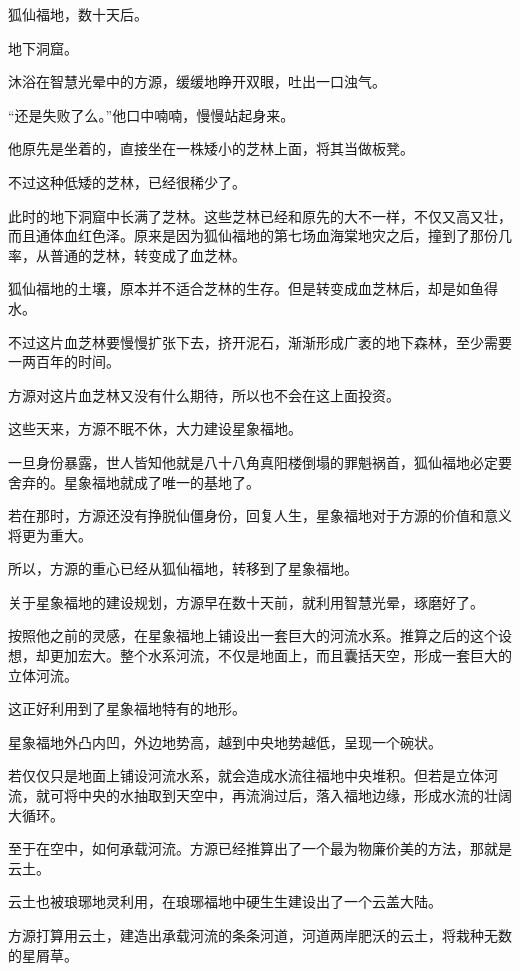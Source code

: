 \begin{this_body}
狐仙福地，数十天后。

地下洞窟。

沐浴在智慧光晕中的方源，缓缓地睁开双眼，吐出一口浊气。

“还是失败了么。”他口中喃喃，慢慢站起身来。

他原先是坐着的，直接坐在一株矮小的芝林上面，将其当做板凳。

不过这种低矮的芝林，已经很稀少了。

此时的地下洞窟中长满了芝林。这些芝林已经和原先的大不一样，不仅又高又壮，而且通体血红色泽。原来是因为狐仙福地的第七场血海棠地灾之后，撞到了那份几率，从普通的芝林，转变成了血芝林。

狐仙福地的土壤，原本并不适合芝林的生存。但是转变成血芝林后，却是如鱼得水。

不过这片血芝林要慢慢扩张下去，挤开泥石，渐渐形成广袤的地下森林，至少需要一两百年的时间。

方源对这片血芝林又没有什么期待，所以也不会在这上面投资。

这些天来，方源不眠不休，大力建设星象福地。

一旦身份暴露，世人皆知他就是八十八角真阳楼倒塌的罪魁祸首，狐仙福地必定要舍弃的。星象福地就成了唯一的基地了。

若在那时，方源还没有挣脱仙僵身份，回复人生，星象福地对于方源的价值和意义将更为重大。

所以，方源的重心已经从狐仙福地，转移到了星象福地。

关于星象福地的建设规划，方源早在数十天前，就利用智慧光晕，琢磨好了。

按照他之前的灵感，在星象福地上铺设出一套巨大的河流水系。推算之后的这个设想，却更加宏大。整个水系河流，不仅是地面上，而且囊括天空，形成一套巨大的立体河流。

这正好利用到了星象福地特有的地形。

星象福地外凸内凹，外边地势高，越到中央地势越低，呈现一个碗状。

若仅仅只是地面上铺设河流水系，就会造成水流往福地中央堆积。但若是立体河流，就可将中央的水抽取到天空中，再流淌过后，落入福地边缘，形成水流的壮阔大循环。

至于在空中，如何承载河流。方源已经推算出了一个最为物廉价美的方法，那就是云土。

云土也被琅琊地灵利用，在琅琊福地中硬生生建设出了一个云盖大陆。

方源打算用云土，建造出承载河流的条条河道，河道两岸肥沃的云土，将栽种无数的星屑草。


\end{this_body}
